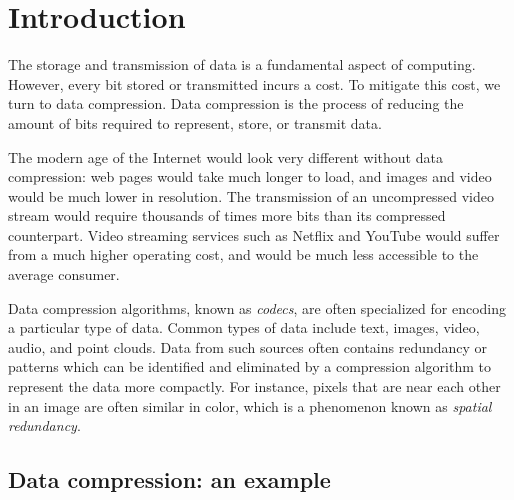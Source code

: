 \chapter{Introduction}
\label{ch:introduction}



The storage and transmission of data is a fundamental aspect of computing.
However, every bit stored or transmitted incurs a cost.
To mitigate this cost, we turn to data compression.
Data compression is the process of reducing the amount of bits required to represent, store, or transmit data.

The modern age of the Internet would look very different without data compression: web pages would take much longer to load, and images and video would be much lower in resolution.
The transmission of an uncompressed video stream would require thousands of times more bits than its compressed counterpart.
Video streaming services such as Netflix and YouTube would suffer from a much higher operating cost, and would be much less accessible to the average consumer.

Data compression algorithms, known as \emph{codecs}, are often specialized for encoding a particular type of data.
Common types of data include text, images, video, audio, and point clouds.
Data from such sources often contains redundancy or patterns which can be identified and eliminated by a compression algorithm to represent the data more compactly.
For instance, pixels that are near each other in an image are often similar in color, which is a phenomenon known as \emph{spatial redundancy}.




\section{Data compression: an example}

%

